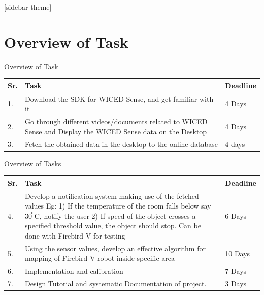 \documentclass[10pt, a4paper]{beamer}
\begin{document}
[sidebar theme]
\section{Overview of Task}
\begin{frame}{Overview of Task}	

\begin{center}
\begin{tabular}{ | m{0.5cm}| m{5cm} | m{1.5cm}| } 
\hline
Sr. &  Task
& Deadline\\ 
\hline
1. & Download the SDK for WICED Sense, and get familiar with it & 4 Days  \\ 
\hline
2. & Go through different videos/documents related to WICED Sense and
Display the WICED Sense data on the Desktop
& 4 Days \\
\hline
3. & Fetch the obtained data in the desktop to the online database & 4 days\\

\hline
\end{tabular}
\end{center}
\end{frame}

\begin{frame}{Overview of Tasks}
\begin{center}
\begin{tabular}{ | m{0.5cm}| m{5cm} | m{1.5cm}| } 
\hline
Sr. & Task
& Deadline\\ 
\hline
4. & Develop a notification system making use of the fetched values
Eg: 1) If the temperature of the room falls below say 30֯ C, notify the user
      2) If speed of the object crosses a specified threshold  value,                               the object should stop. Can be done with Firebird V for testing & 6 Days\\	
\hline
5. & Using the sensor values, develop an effective algorithm for mapping of Firebird V robot inside specific area & 10 Days\\
\hline
6. & Implementation and calibration & 7 Days\\
\hline
7. & Design Tutorial and systematic Documentation of project. & 3 Days\\
\hline
\end{tabular} 
\end{center}
\end{frame}
\end{document}
